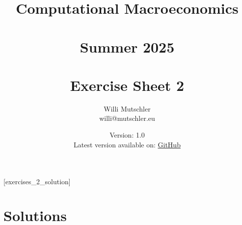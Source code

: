 
\newif\ifDisplaySolutions\DisplaySolutionstrue%


\title{Computational Macroeconomics\\~\\Summer 2025\\~\\Exercise Sheet 2}
\author{Willi Mutschler\\willi@mutschler.eu}
\date{Version: 1.0\\Latest version available on: \href{https://github.com/wmutschl/Computational-Macroeconomics/releases/latest/download/exercises_2.pdf}{GitHub}}
\maketitle\thispagestyle{empty}

\newpage
{}[exercises_2_solution]
\tableofcontents\thispagestyle{empty}\newpage

\setcounter{page}{1}
\newpage
\newpage
\newpage
\printbibliography%
\newpage

\ifDisplaySolutions%
\newpage
\appendix
\section{Solutions}

\fi
